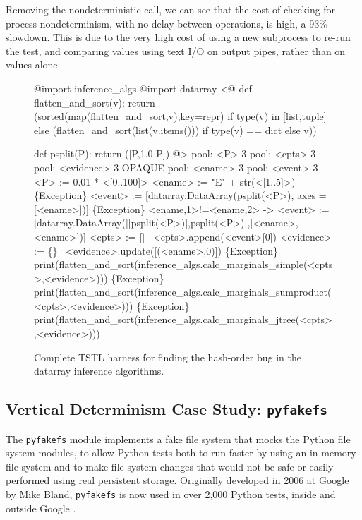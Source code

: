 Removing the nondeterministic call, we can see that the cost of
checking for process nondeterminism, with no delay between operations,
is high, a 93\% slowdown.  This is due to the very high cost of
using a new subprocess to re-run the test, and comparing values using
text I/O on output pipes, rather than on values alone.


\begin{figure*}
{\scriptsize
\begin{code}
@import inference\_algs
@import datarray
\vspace{0.1in}
<@
def flatten\_and\_sort(v):
    return (sorted(map(flatten\_and\_sort,v),key=repr) if type(v) in [list,tuple] else
                (flatten\_and\_sort(list(v.items())) if type(v) == dict else v))

def psplit(P):
    return ([P,1.0-P])
@>
\vspace{0.1in}
pool: <P> 3
pool: <cpts> 3
pool: <evidence> 3 OPAQUE
pool: <ename> 3
pool: <event> 3
\vspace{0.1in}
<P> := 0.01 * <[0..100]>
\vspace{0.1in}
<ename> := "E" + str(<[1..5]>)
\vspace{0.1in}
\{Exception\} <event> := [datarray.DataArray(psplit(<P>), axes = [<ename>])]
\{Exception\} <ename,1>!=<ename,2> -> <event> := [datarray.DataArray([[psplit(<P>)],psplit(<P>)],[<ename>,<ename>])]
\vspace{0.1in}
<cpts> := []
~<cpts>.append(<event>[0])
\vspace{0.1in}
<evidence> := \{\}
~<evidence>.update([(<ename>,0)])
\vspace{0.1in}
\{Exception\} print(flatten\_and\_sort(inference\_algs.calc\_marginals\_simple(<cpts>,<evidence>)))
\{Exception\} print(flatten\_and\_sort(inference\_algs.calc\_marginals\_sumproduct(<cpts>,<evidence>)))
\{Exception\} print(flatten\_and\_sort(inference\_algs.calc\_marginals\_jtree(<cpts>,<evidence>)))
\end{code}
}
\caption {Complete TSTL harness for finding the hash-order bug in the datarray
  inference algorithms.}
\label{hashbug}
\end{figure*}

\subsection {Vertical Determinism Case Study: {\tt pyfakefs}}

The {\tt pyfakefs} \cite{pyfakefs} module implements a fake file
system that mocks the Python file system modules, to allow Python
tests both to run faster by using an in-memory file system and to make
file system changes that would not be safe or easily performed using
real persistent storage.  Originally developed in 2006 at Google by
Mike Bland, {\tt pyfakefs} is now used in over 2,000 Python tests,
inside and outside Google \cite{pyfakefs}.

